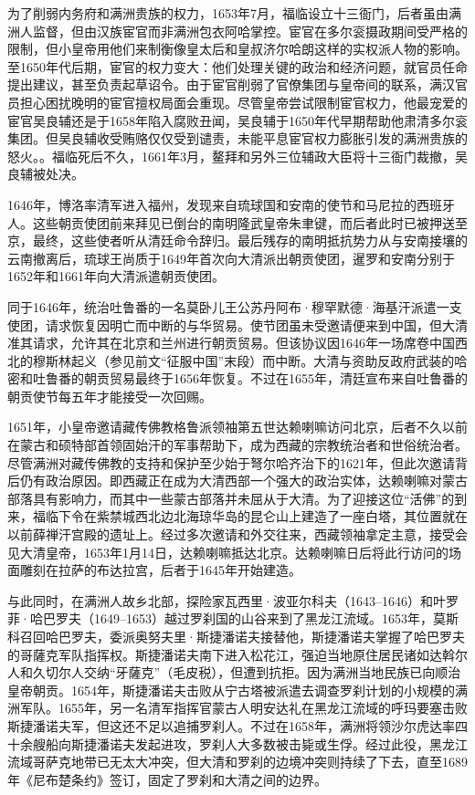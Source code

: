 为了削弱内务府和满洲贵族的权力，1653年7月，福临设立十三衙门，后者虽由满洲人监督，但由汉族宦官而非满洲包衣阿哈掌控。宦官在多尔衮摄政期间受严格的限制，但小皇帝用他们来制衡像皇太后和皇叔济尔哈朗这样的实权派人物的影响。至1650年代后期，宦官的权力变大：他们处理关键的政治和经济问题，就官员任命提出建议，甚至负责起草诏令。由于宦官削弱了官僚集团与皇帝间的联系，满汉官员担心困扰晚明的宦官擅权局面会重现。尽管皇帝尝试限制宦官权力，他最宠爱的宦官吴良辅还是于1658年陷入腐败丑闻，吴良辅于1650年代早期帮助他肃清多尔衮集团。但吴良辅收受贿赂仅仅受到谴责，未能平息宦官权力膨胀引发的满洲贵族的怒火。。福临死后不久，1661年3月，鳌拜和另外三位辅政大臣将十三衙门裁撤，吴良辅被处决。

1646年，博洛率清军进入福州，发现来自琉球国和安南的使节和马尼拉的西班牙人。这些朝贡使团前来拜见已倒台的南明隆武皇帝朱聿键，而后者此时已被押送至京，最终，这些使者听从清廷命令辞归。最后残存的南明抵抗势力从与安南接壤的云南撤离后，琉球王尚质于1649年首次向大清派出朝贡使团，暹罗和安南分别于1652年和1661年向大清派遣朝贡使团。

同于1646年，统治吐鲁番的一名莫卧儿王公苏丹阿布·穆罕默德·海基汗派遣一支使团，请求恢复因明亡而中断的与华贸易。使节团虽未受邀请便来到中国，但大清准其请求，允许其在北京和兰州进行朝贡贸易。但该协议因1646年一场席卷中国西北的穆斯林起义（参见前文“征服中国”末段）而中断。大清与资助反政府武装的哈密和吐鲁番的朝贡贸易最终于1656年恢复。不过在1655年，清廷宣布来自吐鲁番的朝贡使节每五年才能接受一次回赐。

1651年，小皇帝邀请藏传佛教格鲁派领袖第五世达赖喇嘛访问北京，后者不久以前在蒙古和硕特部首领固始汗的军事帮助下，成为西藏的宗教统治者和世俗统治者。尽管满洲对藏传佛教的支持和保护至少始于弩尔哈齐治下的1621年，但此次邀请背后仍有政治原因。即西藏正在成为大清西部一个强大的政治实体，达赖喇嘛对蒙古部落具有影响力，而其中一些蒙古部落并未屈从于大清。为了迎接这位“活佛”的到来，福临下令在紫禁城西北边北海琼华岛的昆仑山上建造了一座白塔，其位置就在以前薛禅汗宫殿的遗址上。经过多次邀请和外交往来，西藏领袖拿定主意，接受会见大清皇帝，1653年1月14日，达赖喇嘛抵达北京。达赖喇嘛日后将此行访问的场面雕刻在拉萨的布达拉宫，后者于1645年开始建造。

与此同时，在满洲人故乡北部，探险家瓦西里·波亚尔科夫（1643–1646）和叶罗菲·哈巴罗夫（1649–1653）越过罗刹国的山谷来到了黑龙江流域。1653年，莫斯科召回哈巴罗夫，委派奥努夫里·斯捷潘诺夫接替他，斯捷潘诺夫掌握了哈巴罗夫的哥薩克军队指挥权。斯捷潘诺夫南下进入松花江，强迫当地原住居民诸如达斡尔人和久切尔人交纳“牙薩克”（毛皮税），但遭到抗拒。因为满洲当地民族已向顺治皇帝朝贡。1654年，斯捷潘诺夫击败从宁古塔被派遣去调查罗刹计划的小规模的满洲军队。1655年，另一名清军指挥官蒙古人明安达礼在黑龙江流域的呼玛要塞击败斯捷潘诺夫军，但这还不足以追捕罗刹人。不过在1658年，满洲将领沙尔虎达率四十余艘船向斯捷潘诺夫发起进攻，罗刹人大多数被击毙或生俘。经过此役，黑龙江流域哥萨克地带已无太大冲突，但大清和罗刹的边境冲突则持续了下去，直至1689年《尼布楚条约》签订，固定了罗刹和大清之间的边界。

